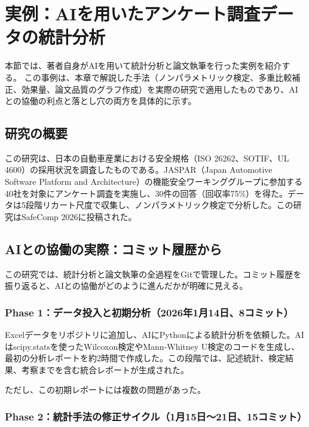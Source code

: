 \section{実例：AIを用いたアンケート調査データの統計分析}
\label{sec:7.6}

本節では、著者自身がAIを用いて統計分析と論文執筆を行った実例を紹介する。
この事例は、本章で解説した手法（ノンパラメトリック検定、多重比較補正、効果量、論文品質のグラフ作成）を実際の研究で適用したものであり、AIとの協働の利点と落とし穴の両方を具体的に示す。

\subsection{研究の概要}

この研究は、日本の自動車産業における安全規格（ISO 26262、SOTIF、UL 4600）の採用状況を調査したものである。JASPAR（Japan Automotive Software Platform and Architecture）の機能安全ワーキンググループに参加する40社を対象にアンケート調査を実施し、30件の回答（回収率75\%）を得た。データは5段階リカート尺度で収集し、ノンパラメトリック検定で分析した。この研究はSafeComp 2026に投稿された。

\subsection{AIとの協働の実際：コミット履歴から}

この研究では、統計分析と論文執筆の全過程をGitで管理した。コミット履歴を振り返ると、AIとの協働がどのように進んだかが明確に見える。

\subsubsection{Phase 1：データ投入と初期分析（2026年1月14日、8コミット）}

Excelデータをリポジトリに追加し、AIにPythonによる統計分析を依頼した。AIはscipy.statsを使ったWilcoxon検定やMann-Whitney U検定のコードを生成し、最初の分析レポートを約2時間で作成した。この段階では、記述統計、検定結果、考察までを含む統合レポートが生成された。

ただし、この初期レポートには複数の問題があった。

\subsubsection{Phase 2：統計手法の修正サイクル（1月15日〜21日、15コミット）}

